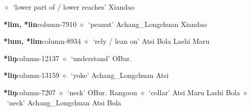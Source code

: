          $\diamond$~`lower part of / lower reaches'
         Xiandao 
  \item {\footnotesize \textbf{*lim, *lin}}{\tiny column-7910}
         $\diamond$~`peanut'
         Achang\_Longchuan 
\hspace{1ex}
         Xiandao 
  \item {\footnotesize \textbf{*lum, *lim}}{\tiny column-8934}
         $\diamond$~`rely / lean on'
         Atsi 
\hspace{1ex}
         Bola 
\hspace{1ex}
         Lashi 
\hspace{1ex}
         Maru 
  \item {\footnotesize \textbf{*liŋ}}{\tiny column-12137}
         $\diamond$~`understand'
         OBur. 
  \item {\footnotesize \textbf{*liŋ}}{\tiny column-13159}
         $\diamond$~`yoke'
         Achang\_Longchuan 
\hspace{1ex}
         Atsi 
  \item {\footnotesize \textbf{*liŋ}}{\tiny column-7207}
         $\diamond$~`neck'
         OBur. 
\hspace{1ex}
         Rangoon 
\hspace{1ex}
         $\diamond$~`collar'
         Atsi 
\hspace{1ex}
         Maru 
\hspace{1ex}
         Lashi 
\hspace{1ex}
         Bola 
\hspace{1ex}
         $\diamond$~`neck'
         Achang\_Longchuan 
\hspace{1ex}
         Atsi 
\hspace{1ex}
         Bola 
\hspace{1ex}
